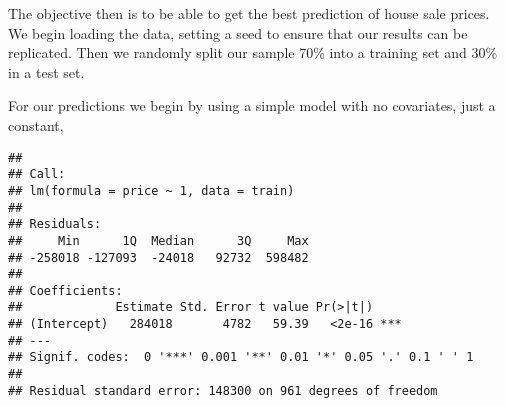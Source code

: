 The objective then is to be able to get the best prediction of house sale prices. We begin loading the data, setting a seed to ensure that our results can be replicated. Then we randomly split our sample 70\% into a training set and 30\% in a test set.


\begin{Shaded}
\end{Shaded}
For our predictions we begin by using a simple model with no covariates, just a constant,

\begin{Shaded}
\begin{Highlighting}[]
\OperatorTok{~}\NormalTok{,}
\end{Highlighting}
\end{Shaded}

\begin{verbatim}
## 
## Call:
## lm(formula = price ~ 1, data = train)
## 
## Residuals:
##     Min      1Q  Median      3Q     Max 
## -258018 -127093  -24018   92732  598482 
## 
## Coefficients:
##             Estimate Std. Error t value Pr(>|t|)    
## (Intercept)   284018       4782   59.39   <2e-16 ***
## ---
## Signif. codes:  0 '***' 0.001 '**' 0.01 '*' 0.05 '.' 0.1 ' ' 1
## 
## Residual standard error: 148300 on 961 degrees of freedom
\end{verbatim}


